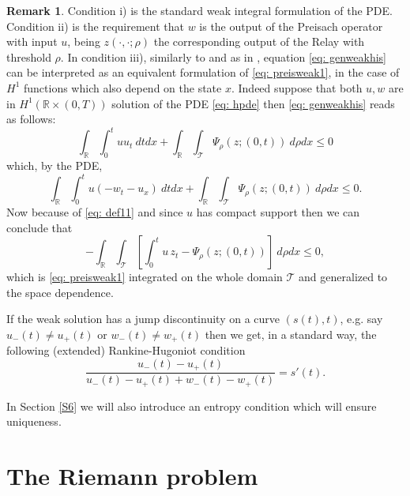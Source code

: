 \documentclass[12pt]{article}
\newcommand{\R}{\mathbb{R}}
\newcommand{\T}{\mathcal{T}}
\newcommand{\p}{\rho}
\newcommand{\RH}{Rankine-Hugoniot }
\newcommand{\1}{\mathds{1}}
\theoremstyle{definition}
\newtheorem{rmk}[teo]{Remark}
\begin{document}
\begin{rmk} Condition i) is the standard weak integral formulation of the PDE. Condition ii) is the requirement that $w$ is the output of the Preisach operator with input $u$, being $z(\cdot,\cdot;\rho)$ the corresponding output of the Relay with threshold $\rho$. In condition iii), similarly to \cite{AVH1} and as in \cite{BFMS}, equation \eqref{eq: genweakhis} can be interpreted as an equivalent formulation of \eqref{eq: preisweak1}, in the case of $H^1$ functions which also depend on the state $x$. Indeed suppose that both $u, w$ are in $H^1(\R \times (0,T))$  solution of the PDE \eqref{eq: hpde} then \eqref{eq: genweakhis} reads as follows: \begin{equation}
        \int_\R \int_0^t u u_t~dtdx+\int_\R \int_\T \Psi_\p(z; (0,t)) ~d\p dx \leq 0
    \end{equation} which, by the PDE, \begin{equation}
        \int_\R \int_0^t u (-w_t-u_x)~dtdx+\int_\R \int_\T \Psi_\p(z; (0,t)) ~d\p dx \leq 0.
    \end{equation} Now because of \eqref{eq: def11} and since $u$ has compact support then we can conclude that \begin{equation}
        -\int_\R  \int_\T \left[ \int_0^t u\, z_t - \Psi_\p(z; (0,t))\right] ~d\p dx \leq 0,
    \end{equation} which is \eqref{eq: preisweak1} integrated on the whole domain $\T$ and generalized to the space dependence.
\end{rmk}

If the weak solution has a jump discontinuity on a curve $(s(t),t)$, e.g. say $u_-(t)\not= u_+(t)$ or $w_-(t)\not=w_+(t)$ then we get, in a standard way, the following (extended) \RH condition \begin{equation}\label{eq: hrhcond}
    \frac{u_-(t)-u_+(t)}{u_-(t)-u_+(t)+w_-(t)-w_+(t)} = s'(t).
\end{equation}

\noindent
In Section \ref{S6} we will also introduce an entropy condition which will ensure uniqueness.




\section{The Riemann problem}\label{S4}
\end{document}
